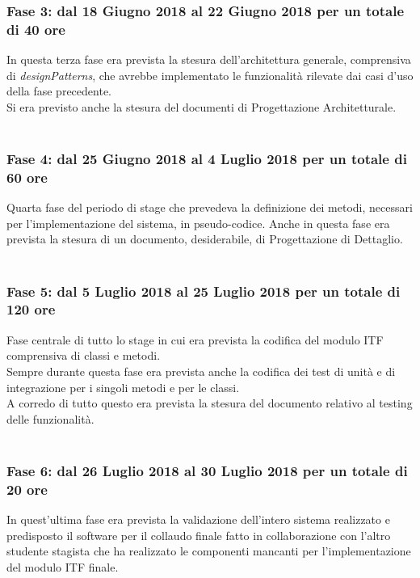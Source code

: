 \subsubsection{Fase 3: dal 18 Giugno 2018 al 22 Giugno 2018 per un totale di 40 ore}
In questa terza fase era prevista la stesura dell'architettura generale, comprensiva di \emph{\gls{designPatterns}}\glsfirstoccur, che avrebbe implementato le funzionalità rilevate dai casi d'uso della fase precedente.\\
Si era previsto anche la stesura del documenti di Progettazione Architetturale.\\\\

\subsubsection{Fase 4: dal 25 Giugno 2018 al 4 Luglio 2018 per un totale di 60 ore}
Quarta fase del periodo di stage che prevedeva la definizione dei metodi, necessari per l'implementazione del sistema, in pseudo-codice. Anche in questa fase era prevista la stesura di un documento, desiderabile, di Progettazione di Dettaglio.\\\\

\subsubsection{Fase 5: dal 5 Luglio 2018 al 25 Luglio 2018 per un totale di 120 ore}
Fase centrale di tutto lo stage in cui era prevista la codifica del modulo \gls{ITF} comprensiva di classi e metodi.\\
Sempre durante questa fase era prevista anche la codifica dei test di unità e di integrazione per i singoli metodi e per le classi.\\
A corredo di tutto questo era prevista la stesura del documento relativo al testing delle funzionalità.\\\\

\subsubsection{Fase 6: dal 26 Luglio 2018 al 30 Luglio 2018 per un totale di 20 ore}
In quest'ultima fase era prevista la validazione dell'intero sistema realizzato e predisposto il software per il collaudo finale fatto in collaborazione con l'altro studente stagista che ha realizzato le componenti mancanti per l'implementazione del modulo \gls{ITF} finale.\\\\

